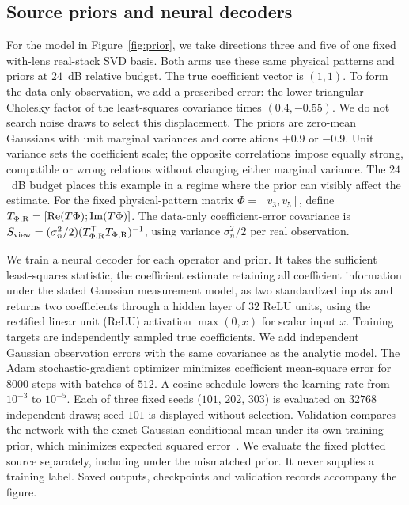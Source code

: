\documentclass[lineno,pdflatex,sn-nature]{sn-jnl}%
\theoremstyle{thmstyleone}%
\theoremstyle{thmstyletwo}%
\theoremstyle{thmstylethree}%
\begin{document}
\subsection{Source priors and neural decoders}

For the model in Figure~\ref{fig:prior}, we take directions three and five of one fixed with-lens real-stack SVD basis. Both arms use these same physical patterns and priors at $24$~dB relative budget. The true coefficient vector is $(1,1)$. To form the data-only observation, we add a prescribed error: the lower-triangular Cholesky factor of the least-squares covariance times $(0.4,-0.55)$. We do not search noise draws to select this displacement. The priors are zero-mean Gaussians with unit marginal variances and correlations $+0.9$ or $-0.9$. Unit variance sets the coefficient scale; the opposite correlations impose equally strong, compatible or wrong relations without changing either marginal variance. The $24$~dB budget places this example in a regime where the prior can visibly affect the estimate. For the fixed physical-pattern matrix $\Phi=[v_3,v_5]$, define $T_{\Phi,\rm R}=[\operatorname{Re}(T\Phi);\operatorname{Im}(T\Phi)]$. The data-only coefficient-error covariance is $S_{\rm view}=(\sigma_n^2/2)(T_{\Phi,\rm R}^{\mathsf T}T_{\Phi,\rm R})^{-1}$, using variance $\sigma_n^2/2$ per real observation.


We train a neural decoder for each operator and prior. It takes the sufficient least-squares statistic, the coefficient estimate retaining all coefficient information under the stated Gaussian measurement model, as two standardized inputs and returns two coefficients through a hidden layer of $32$ ReLU units, using the rectified linear unit (ReLU) activation $\max(0,x)$ for scalar input $x$. Training targets are independently sampled true coefficients. We add independent Gaussian observation errors with the same covariance as the analytic model. The Adam stochastic-gradient optimizer minimizes coefficient mean-square error for $8000$ steps with batches of $512$. A cosine schedule lowers the learning rate from $10^{-3}$ to $10^{-5}$. Each of three fixed seeds ($101$, $202$, $303$) is evaluated on $32768$ independent draws; seed $101$ is displayed without selection. Validation compares the network with the exact Gaussian conditional mean under its own training prior, which minimizes expected squared error~\cite{bishop2006}. We evaluate the fixed plotted source separately, including under the mismatched prior. It never supplies a training label. Saved outputs, checkpoints and validation records accompany the figure.
\end{document}
